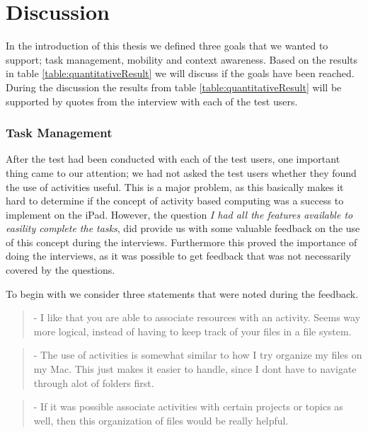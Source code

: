 \section{Discussion}
In the introduction of this thesis we defined three goals that we wanted to support; task management, mobility and context awareness. Based on the results in table \ref{table:quantitativeResult} we will discuss if the goals have been reached. During the discussion the results from table \ref{table:quantitativeResult} will be supported by quotes from the interview with each of the test users. 

\subsubsection{Task Management}
After the test had been conducted with each of the test users, one important thing came to our attention; we had not asked the test users whether they found the use of activities useful. This is a major problem, as this basically makes it hard to determine if the concept of activity based computing was a success to implement on the iPad. However, the question \emph{I had all the features available to easility complete the tasks}, did provide us with some valuable feedback on the use of this concept during the interviews. Furthermore this proved the importance of doing the interviews, as it was possible to get feedback that was not necessarily covered by the questions.

To begin with we consider three statements that were noted during the feedback.

\begin{quotation}
	- I 	like that you are able to associate resources with an activity. Seems way more logical, instead of having to keep track of your files in a file system.
\end{quotation}

\begin{quotation}
	- The use of activities is somewhat similar to how I try organize my files on my Mac. This just makes it easier to handle, since I dont have to navigate through alot of folders first.
\end{quotation}

\begin{quotation}
	- If it was possible associate activities with certain projects or topics as well, then this organization of files would be really helpful.
\end{quotation}

